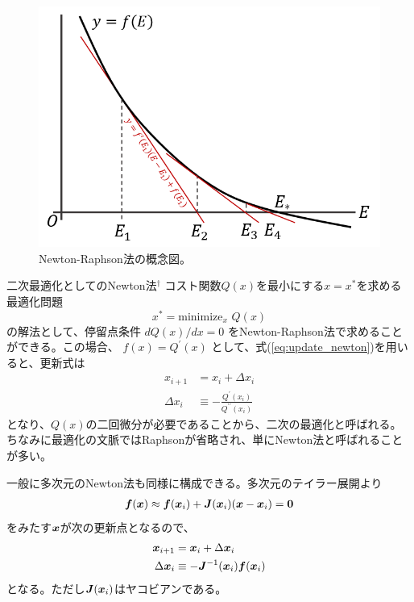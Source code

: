 \begin{figure}[]
 \begin{center}
 \includegraphics[width=1.0\linewidth]{fig/newton_raphthon.png}
\end{center}
	\caption{Newton-Raphson法の概念図。}
	\label{fig:newton_raphson}
\end{figure} 

\begin{itembox}{二次最適化としてのNewton法$^\dagger$}
\footnotesize
\color{gray}
コスト関数$Q(x)$を最小にする$x=x^\ast$を求める最適化問題
\begin{equation}
   x^\ast = \mathrm{minimize}_{x} \,\, Q(x)  
\end{equation}
の解法として、停留点条件
$d Q(x)/d x = 0$
をNewton-Raphson法で求めることができる。この場合、
$f (x) = Q^\prime (x)$
として、式(\ref{eq:update_newton})を用いると、更新式は
\begin{align}
x_{i+1} &= x_i + \Delta x_i \\ 
\Delta x_i &\equiv - \frac{Q^\prime (x_i)}{Q^{\prime\prime}(x_i)}  
\end{align}
となり、$Q(x)$の二回微分が必要であることから、二次の最適化と呼ばれる。ちなみに最適化の文脈ではRaphsonが省略され、単にNewton法と呼ばれることが多い。

一般に多次元のNewton法も同様に構成できる。多次元のテイラー展開より
\begin{align}
\boldsymbol{f}(\boldsymbol{x}) \approx \boldsymbol{f}(\boldsymbol{x}_i) + \boldsymbol{J} (\boldsymbol{x}_i) (\boldsymbol{x} - \boldsymbol{x}_i) = \boldsymbol{0}
\end{align}
をみたす$\boldsymbol{x}$が次の更新点となるので、
\begin{align}
    \boldsymbol{x}_{i+1} &= \boldsymbol{x}_{i} + \Delta \boldsymbol{x}_i \\
    \label{eq:second_newton}
    \Delta \boldsymbol{x}_i &\equiv - \boldsymbol{J}^{-1} (\boldsymbol{x}_i) \boldsymbol{f}(\boldsymbol{x}_i)
\end{align}
となる。ただし$\boldsymbol{J} (\boldsymbol{x}_i)$はヤコビアンである。
\end{itembox}


